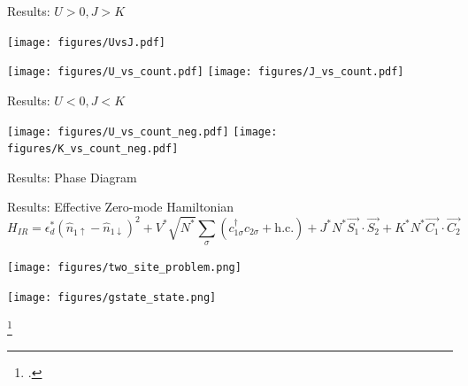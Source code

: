 \documentclass[aspectratio=169]{beamer}
\begin{document}
\begin{frame}[noframenumbering]{Results: \(U>0, J>K\)}
\begin{minipage}{0.6\textwidth}
\begin{center}
	\texttt{[image: figures/UvsJ.pdf]}
\end{center}
\end{minipage}
\begin{minipage}{0.39\textwidth}
\begin{center}
	\texttt{[image: figures/U\_vs\_count.pdf]}
	\texttt{[image: figures/J\_vs\_count.pdf]}
\end{center}
\end{minipage}
\end{frame}


\begin{frame}[noframenumbering]{Results: \(U<0, J<K\)}
	\vspace*{30pt}
\begin{center}
	\texttt{[image: figures/U\_vs\_count\_neg.pdf]}
	\texttt{[image: figures/K\_vs\_count\_neg.pdf]}
\end{center}
\end{frame}


\begin{frame}[noframenumbering]{Results: Phase Diagram}
\begin{center}
	\hspace*{-50pt}\def\svgwidth{0.8\columnwidth}
	
\end{center}
\end{frame}


\begin{frame}[noframenumbering]{Results: Effective Zero-mode Hamiltonian}
	\vspace*{-30pt}
	\[H_{IR} = \epsilon_d^* \left( \hat n_{1 \uparrow} - \hat n_{1 \downarrow} \right) ^2 + V^*\sqrt{N^*}\sum_{\sigma}\left(c^\dagger_{1\sigma}c_{2\sigma} + \text{h.c.} \right) + J^*N^*\vec{S_1}\cdot\vec{S_2} + K^*N^*\vec{C_1}\cdot\vec{C_2}\]
\hspace*{-15pt}
	\begin{minipage}{0.5\textwidth}
	{\centering
	\texttt{[image: figures/two\_site\_problem.png]}}
\end{minipage}
\hspace*{25pt}
\begin{minipage}{0.45\textwidth}
	{\centering
	\texttt{[image: figures/gstate\_state.png]}}
\end{minipage}

\footcite{wilson,hrk-nrg,taraphder}

\end{frame}
\end{document}
